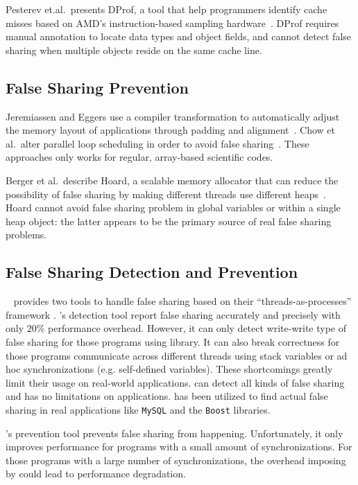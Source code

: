 Pesterev et.al.\ presents DProf, a tool that help programmers identify cache misses based on AMD's instruction-based sampling hardware~\cite{DProf}. DProf requires manual annotation to locate data types and object fields, and cannot detect false sharing when multiple objects reside on the same cache line.

\subsection{False Sharing Prevention}
Jeremiassen and Eggers use a compiler transformation to automatically adjust the memory layout of applications through padding and alignment~\cite{falseshare:compile}. Chow et al.\ alter parallel loop scheduling in order to avoid false
sharing~\cite{falseshare:schedule}. These approaches only works for regular, array-based scientific codes.

Berger et al.\ describe Hoard, a scalable memory allocator that can reduce the possibility of false sharing by making different threads use different heaps~\cite{Hoard}. Hoard cannot avoid false sharing problem in global variables or within
a single heap object: the latter appears to be the primary source of real false sharing problems.

\subsection{False Sharing Detection and Prevention}
\sheriff{}~\cite{sheriff} provides two tools to handle false sharing based on their ``threads-as-processes'' framework .
\Sheriff{}'s detection tool report false sharing accurately and precisely with only $20\%$ performance overhead.
However, it can only detect write-write type of false sharing for those programs using \pthreads{} library. It can also break correctness for those programs communicate across different threads using stack variables or ad hoc synchronizations (e.g. self-defined variables). These shortcomings greatly limit their usage on real-world applications.  
\Predator{} can detect all kinds of false sharing and has no limitations on applications. \Predator{} has been utilized to find actual false sharing in real applications like \texttt{MySQL} and the \texttt{Boost} libraries.

\Sheriff{}'s prevention tool prevents false sharing from happening. Unfortunately, it only improves performance for programs with a small amount of synchronizations. 
For those programs with a large number of synchronizations, the overhead imposing by \Sheriff{} could lead to performance degradation.


